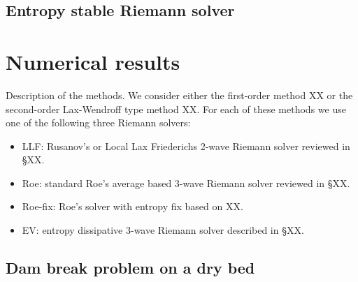 \documentclass[preprint, 11pt]{article}
\begin{document}
\subsection{Entropy stable Riemann solver}

\clearpage

\section{Numerical results}
Description of the methods. We consider either the first-order method XX or the second-order Lax-Wendroff
type method XX. For each of these methods we use one of the following three Riemann solvers: 
\begin{itemize}
  \item LLF: Rusanov's or Local Lax Friederichs 2-wave Riemann solver reviewed in \S XX.
  \item Roe: standard Roe's average based 3-wave Riemann solver reviewed in \S XX. 
  \item Roe-fix: Roe's solver with entropy fix based on XX. 
  \item EV:  entropy dissipative 3-wave Riemann solver described in \S XX.
\end{itemize}

\subsection{Dam break problem on a dry bed}
\end{document}
